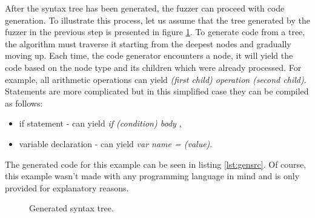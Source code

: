 After the syntax tree has been generated, the fuzzer can proceed with code generation. To illustrate this process, let us assume that the tree generated by the fuzzer in the previous step is presented in figure \ref{fig:gentree}. To generate code from a tree, the algorithm must traverse it starting from the deepest nodes and gradually moving up. Each time, the code generator encounters a node, it will yield the code based on the node type and its children which were already processed. For example, all arithmetic operations can yield \textit{(first child) operation (second child)}. Statements are more complicated but in this simplified case they can be compiled as follows:
\begin{itemize}
    \item if statement - can yield \textit{if (condition) { body }},
    \item variable declaration - can yield \textit{var name = (value)}.
\end{itemize}
The generated code for this example can be seen in listing \ref{lst:gensrc}. Of course, this example wasn't made with any programming language in mind and is only provided for explanatory reasons.

\begin{figure}[h!]
    \centering

    
    \caption{Generated syntax tree.}
    \label{fig:gentree}
\end{figure}

